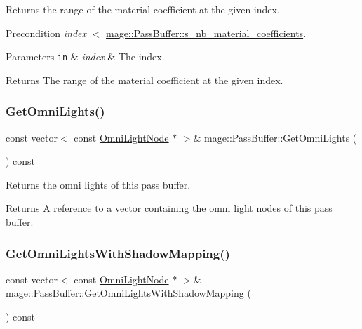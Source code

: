 Returns the range of the material coefficient at the given index.

\begin{DoxyPrecond}{Precondition}
{\itshape index} $<$ \hyperlink{structmage_1_1_pass_buffer_a453e18abdf29c4ebb08d9e002a952bf2}{mage\+::\+Pass\+Buffer\+::s\+\_\+nb\+\_\+material\+\_\+coefficients}. 
\end{DoxyPrecond}

\begin{DoxyParams}[1]{Parameters}
\mbox{\tt in}  & {\em index} & The index. \\
\hline
\end{DoxyParams}
\begin{DoxyReturn}{Returns}
The range of the material coefficient at the given index. 
\end{DoxyReturn}
\hypertarget{structmage_1_1_pass_buffer_a9d085a3784f6e64777b720c8702e2f3e}{}\label{structmage_1_1_pass_buffer_a9d085a3784f6e64777b720c8702e2f3e} 
\subsubsection{\texorpdfstring{Get\+Omni\+Lights()}{GetOmniLights()}}
{\footnotesize\ttfamily const vector$<$ const \hyperlink{namespacemage_a1724c6e6b6b5ba535cdd967cbbb4a669}{Omni\+Light\+Node} $\ast$ $>$\& mage\+::\+Pass\+Buffer\+::\+Get\+Omni\+Lights (\begin{DoxyParamCaption}{ }\end{DoxyParamCaption}) const\hspace{0.3cm}{\ttfamily [noexcept]}}

Returns the omni lights of this pass buffer.

\begin{DoxyReturn}{Returns}
A reference to a vector containing the omni light nodes of this pass buffer. 
\end{DoxyReturn}
\hypertarget{structmage_1_1_pass_buffer_a678adead392b68b985437d3147a6fd38}{}\label{structmage_1_1_pass_buffer_a678adead392b68b985437d3147a6fd38} 
\subsubsection{\texorpdfstring{Get\+Omni\+Lights\+With\+Shadow\+Mapping()}{GetOmniLightsWithShadowMapping()}}
{\footnotesize\ttfamily const vector$<$ const \hyperlink{namespacemage_a1724c6e6b6b5ba535cdd967cbbb4a669}{Omni\+Light\+Node} $\ast$ $>$\& mage\+::\+Pass\+Buffer\+::\+Get\+Omni\+Lights\+With\+Shadow\+Mapping (\begin{DoxyParamCaption}{ }\end{DoxyParamCaption}) const\hspace{0.3cm}{\ttfamily [noexcept]}}

